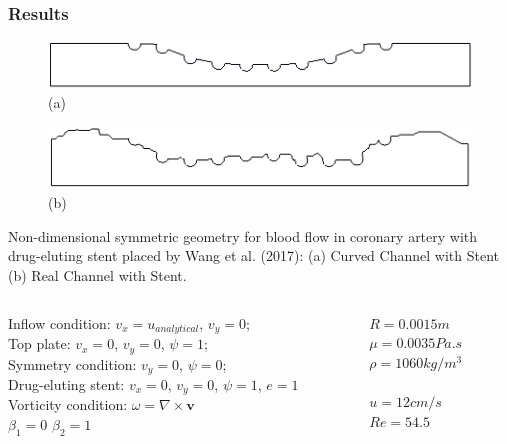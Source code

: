 \begin{frame}
 \frametitle{\LARGE Results}
\begin{figure}
  \vspace{-1cm}
     \centering
     \begin{minipage}{.45\linewidth}
      \centering
      \includegraphics[scale=0.15]{images/CurvedStrut.png}\\
      \scriptsize (a)
     \end{minipage}%
     \begin{minipage}{.45\linewidth}
      \centering
      \includegraphics[scale=0.15]{images/RealStrut.png}\\
      \scriptsize (b)
     \end{minipage}
\end{figure}
\vspace{-0.3cm}
\begin{center}
\scriptsize 
     Non-dimensional symmetric geometry for blood flow in coronary artery with drug-eluting stent placed by Wang et al. (2017):
     (a) Curved Channel with Stent
     (b) Real Channel with Stent.
\end{center}
\vspace{0.05cm}
\small
\begin{center}
\begin{columns}[c]
\begin{column}{0.8\textwidth} 
Inflow condition: $v_{x}=u_{analytical}$, $v_{y}=0$;\\[0.1cm]
Top plate: $v_{x}=0$, $v_{y}=0$, $\psi=1$;\\[0.1cm]
Symmetry condition: $v_{y}=0$, $\psi=0$; \\[0.1cm]
Drug-eluting stent: $v_{x}=0$, $v_{y}=0$, $\psi=1$, $e=1$\\[0.1cm]
Vorticity condition: $\omega = \nabla \times \textbf{v}$\\[0.1cm]
$\beta_{1}=0$ \qquad $\beta_{2}=1$
\end{column}
\hspace{-1cm}
\begin{column}{0.3\textwidth}
$R=0.0015m$\\[0.1cm]
$\mu=0.0035Pa.s$\\[0.1cm]
$\rho=1060kg/m^3$\\[0.1cm]\\
$u=12cm/s$\\[0.1cm]
$Re=54.5$
\end{column}
\end{columns}
\end{center}
\end{frame}


